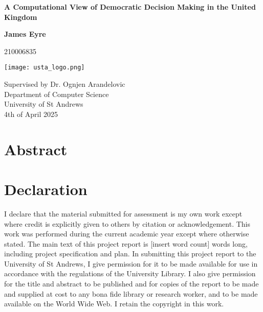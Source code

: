 \documentclass{article}
\begin{document}
\begin{titlepage}
    \begin{center}
        \vspace*{1cm}
            
        \Huge
        \textbf{A Computational View of Democratic Decision Making in the United Kingdom}
        
        
        \vspace{1.5cm}
        \Large
        \textbf{James Eyre}

        210006835
            
        \vspace{0.8cm}
            
        \texttt{[image: usta\_logo.png]}
        
        \vspace{0.8cm}
        \Large
        Supervised by Dr. Ognjen Arandelovic\\
        \vspace{0.8cm}
        \large
        Department of Computer Science\\
        University of St Andrews\\
        4th of April 2025
            
    \end{center}
\end{titlepage}

\section*{Abstract}


\newpage

\section*{Declaration}
I declare that the material submitted for assessment is my
own work except where credit is explicitly given to others by
citation or acknowledgement. This work was performed
during the current academic year except where otherwise
stated.
The main text of this project report is [insert word count] %
words long, including project specification and plan.
In submitting this project report to the University of St
Andrews, I give permission for it to be made available for use
in accordance with the regulations of the University Library.
I also give permission for the title and abstract to be
published and for copies of the report to be made and
supplied at cost to any bona fide library or research worker,
and to be made available on the World Wide Web. I retain
the copyright in this work.
\end{document}
